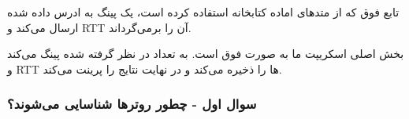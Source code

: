 {
}

تابع فوق که از متد‌های اماده کتابخانه
استفاده کرده است، یک پینگ به ادرس داده شده ارسال می‌کند و RTT آن را برمی‌گرداند.


{
}

بخش اصلی اسکریپت ما به صورت فوق است. به تعداد در نظر گرفته شده پینگ می‌کند و RTT ها را ذخیره می‌کند و در نهایت نتایج را پرینت می‌کند.

\pagebreak




{
}


\subsubsection*{سوال اول - چطور روترها شناسایی می‌شوند؟}

